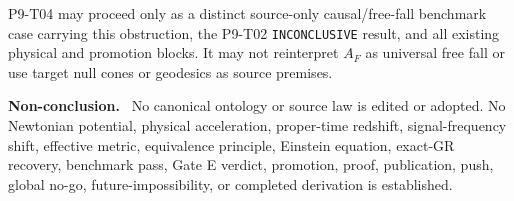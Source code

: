 \documentclass[11pt]{article}
\newenvironment{nonconclusion}{\par\smallskip\noindent\textbf{Non-conclusion.}\ }{\par\smallskip}
\begin{document}
P9-T04 may proceed only as a distinct source-only causal/free-fall benchmark
case carrying this obstruction, the P9-T02 \texttt{INCONCLUSIVE} result, and
all existing physical and promotion blocks.  It may not reinterpret
\(A_F\) as universal free fall or use target null cones or geodesics as source
premises.

\begin{nonconclusion}
No canonical ontology or source law is edited or adopted.  No Newtonian
potential, physical acceleration, proper-time redshift, signal-frequency
shift, effective metric, equivalence principle, Einstein equation, exact-GR
recovery, benchmark pass, Gate E verdict, promotion, proof, publication, push,
global no-go, future-impossibility, or completed derivation is established.
\end{nonconclusion}
\end{document}
